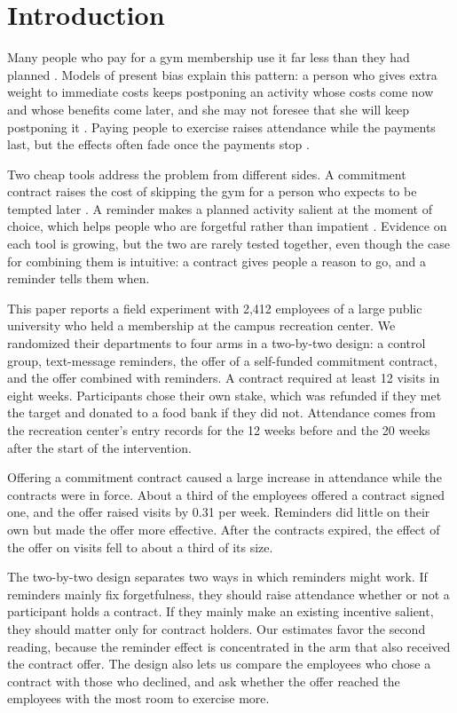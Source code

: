 \section{Introduction}
\label{sec:intro}
Many people who pay for a gym membership use it far less than they had planned \citep{dellavigna2006}. Models of present bias explain this pattern: a person who gives extra weight to immediate costs keeps postponing an activity whose costs come now and whose benefits come later, and she may not foresee that she will keep postponing it \citep{laibson1997,odonoghue1999}. Paying people to exercise raises attendance while the payments last, but the effects often fade once the payments stop \citep{gneezy2012}.

Two cheap tools address the problem from different sides. A commitment contract raises the cost of skipping the gym for a person who expects to be tempted later \citep{bryan2010}. A reminder makes a planned activity salient at the moment of choice, which helps people who are forgetful rather than impatient \citep{karlan2016}. Evidence on each tool is growing, but the two are rarely tested together, even though the case for combining them is intuitive: a contract gives people a reason to go, and a reminder tells them when.

This paper reports a field experiment with 2,412 employees of a large public university who held a membership at the campus recreation center. We randomized their departments to four arms in a two-by-two design: a control group, text-message reminders, the offer of a self-funded commitment contract, and the offer combined with reminders. A contract required at least 12 visits in eight weeks. Participants chose their own stake, which was refunded if they met the target and donated to a food bank if they did not. Attendance comes from the recreation center's entry records for the 12 weeks before and the 20 weeks after the start of the intervention.

Offering a commitment contract caused a large increase in attendance while the contracts were in force. About a third of the employees offered a contract signed one, and the offer raised visits by 0.31 per week. Reminders did little on their own but made the offer more effective. After the contracts expired, the effect of the offer on visits fell to about a third of its size.

The two-by-two design separates two ways in which reminders might work. If reminders mainly fix forgetfulness, they should raise attendance whether or not a participant holds a contract. If they mainly make an existing incentive salient, they should matter only for contract holders. Our estimates favor the second reading, because the reminder effect is concentrated in the arm that also received the contract offer. The design also lets us compare the employees who chose a contract with those who declined, and ask whether the offer reached the employees with the most room to exercise more.

